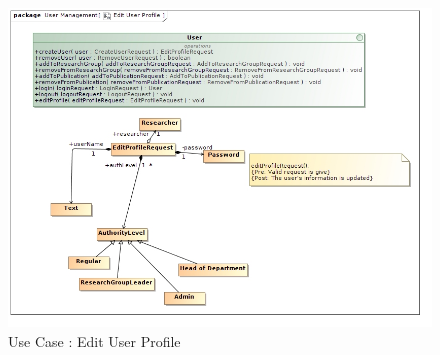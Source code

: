 \documentclass{article}
\begin{document}
		\begin{figure}[H]
			\includegraphics[scale=0.6]{ReinhardtImages/Edit User Profile.jpg}
			\caption{Use Case : Edit User Profile}
	  		\label{Use Case : Edit User Profile}
		\end{figure}		  	
\end{document}
